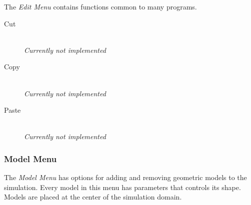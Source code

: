\documentclass[11pt,titlepage,twoside]{article}
\begin{document}
The \emph{Edit Menu} contains functions common to many programs.

\begin{description}

  \item[Cut] \hfill \\
  \emph{Currently not implemented}
  
  \item[Copy] \hfill \\
  \emph{Currently not implemented}
  
  \item[Paste] \hfill \\
  \emph{Currently not implemented}

\end{description}

\subsubsection{Model Menu}
\label{sec:ModelMenu}

The \emph{Model Menu} has options for adding and removing geometric models to the simulation. Every model in this menu has parameters that controls its shape. Models are placed at the center of the simulation domain.
\end{document}

